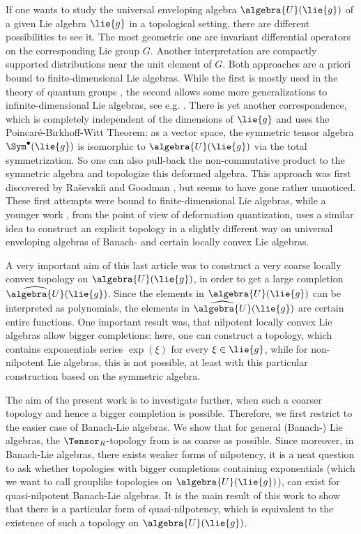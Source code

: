 \documentclass[
11pt,                          %
english                        %
]{article}
\begin{document}
If one wants to study the universal enveloping algebra $\algebra{U}(\lie{g})$ of a 
given Lie algebra $\lie{g}$ in a topological setting, there are different 
possibilities to see it. The most geometric one are invariant differential operators 
on the corresponding Lie group $G$. Another interpretation are compactly supported 
distributions near the unit element of $G$. Both approaches are a priori bound to 
finite-dimensional Lie algebras. While the first is mostly used in the theory of 
quantum groups \cite{pflaum.schottenloher:1998a}, the second allows some more 
generalizations to infinite-dimensional Lie algebras, see e.g. 
\cite{beltita.nicolae:2015a}. There is yet another correspondence, which is 
completely independent of the dimensions of $\lie{g}$ and uses the 
Poincar\'e-Birkhoff-Witt Theorem: as a vector space, the symmetric tensor algebra 
$\Sym^{\bullet}(\lie{g})$ is isomorphic to $\algebra{U}(\lie{g})$ via the total 
symmetrization. So one can also pull-back the non-commutative product to the 
symmetric algebra and topologize this deformed algebra. This approach was first 
discovered by Ra{\v s}evski\u{\i} \cite{rasevskii:1966a} and Goodman 
\cite{goodman:1971a}, but seems to have gone rather unnoticed. These first attempts 
were bound to finite-dimensional Lie algebras, while a younger work 
\cite{esposito.stapor.waldmann:2015a:pre}, from the point of view of deformation 
quantization, uses a similar idea to construct an explicit topology in a slightly 
different way on universal enveloping algebras of Banach- and certain locally convex 
Lie algebras.

A very important aim of this last article was to construct a very coarse locally 
convex topology on $\algebra{U}(\lie{g})$, in order to get a large completion 
$\widehat{\algebra{U}}(\lie{g})$. Since the elements in $\algebra{U}(\lie{g})$ can be 
interpreted as polynomials, the elements in $\widehat{\algebra{U}}(\lie{g})$ are 
certain entire functions. One important result was, that nilpotent locally convex Lie 
algebras allow bigger completions: here, one can construct a topology, which contains 
exponentials series $\exp(\xi)$ for every $\xi \in \lie{g}$, while for non-nilpotent 
Lie algebras, this is not possible, at least with this particular construction based 
on the symmetric algebra.

The aim of the present work is to investigate further, when such a coarser topology 
and hence a bigger completion is possible. Therefore, we first restrict to the easier 
case of Banach-Lie algebras. We show that for general (Banach-) Lie algebras, the 
$\Tensor_R$-topology from \cite{esposito.stapor.waldmann:2015a:pre} is as coarse as 
possible. Since moreover, in Banach-Lie algebras, there exists weaker forms of 
nilpotency, it is a neat question to ask whether topologies with bigger completions 
containing exponentials (which we want to call grouplike topologies on $\algebra{U}
(\lie{g})$), can exist for quasi-nilpotent Banach-Lie algebras. It is the main result 
of this work to show that there is a particular form of quasi-nilpotency, which is 
equivalent to the existence of such a topology on $\algebra{U}(\lie{g})$.
\end{document}
